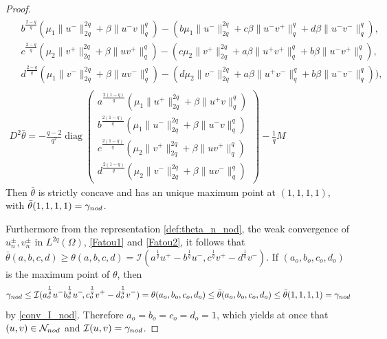 \documentclass[10pt,a4paper]{amsart}
\numberwithin{equation}{section}
\begin{document}
\begin{proof}
\begin{gather*}
\begin{aligned}
& b^{\frac{2-q}q}(\mu_1\|u^-\|_{2q}^{2q} +\beta\|u^-v\|_q^q)
  - (b \mu_1\|u^-\|_{2q}^{2q} +c\beta \|u^-v^+\|_q^q +d \beta \|u^-v^-\|_q^q),\\
&  c^{\frac{2-q}q}(\mu_2\|v^+\|_{2q}^{2q} +\beta\|uv^+\|_q^q)
 - (c \mu_2\|v^+\|_{2q}^{2q} +a\beta \|u^+v^+\|_q^q +b \beta \|u^-v^+\|_q^q),\\
& d^{\frac{2-q}q}(\mu_1\|v^-\|_{2q}^{2q} +\beta\|uv^-\|_q^q)
 - (d \mu_2\|v^-\|_{2q}^{2q} +a\beta \|u^+v^-\|_q^q +b \beta \|u^-v^-\|_q^q)
 \Big),
\end{aligned} \\
 D^2\bar\theta
 = -\frac{q-2}{q^2} \operatorname{diag}
\begin{pmatrix}
 a^{\frac{2(1-q)}q}(\mu_1\|u^+\|_{2q}^{2q} +\beta\|u^+v\|_q^q) \\
 b^{\frac{2(1-q)}q}(\mu_1\|u^-\|_{2q}^{2q} +\beta\|u^-v\|_q^q) \\
 c^{\frac{2(1-q)}q}(\mu_2\|v^+\|_{2q}^{2q} +\beta\|uv^+\|_q^q) \\
 d^{\frac{2(1-q)}q}(\mu_2\|v^-\|_{2q}^{2q} +\beta\|uv^-\|_q^q)
 \end{pmatrix}
- \frac{1}q M
\end{gather*}
Then  $\bar\theta$ is strictly concave and has an unique maximum point at
$(1,1,1,1)$, with $\bar\theta(1,1,1,1)= \gamma_{\rm nod}$.

Furthermore from the representation \eqref{def:theta_n_nod},  the weak convergence
of $u^{\pm}_n, v^{\pm}_n$ in $L^{2q}(\Omega)$, \eqref{Fatou1} and \eqref{Fatou2},
it follows that
$\bar \theta (a,b,c,d)\ge \theta (a,b,c,d)
=\mathcal I(a^{\frac{1}q}u^+\!-b^{\frac{1}q}u^-,c^{\frac{1}q}v^+\! - d^{\frac{1}q}v^-)$.
If $(a_o,b_o,c_o,d_o)$ is the maximum point of $\theta$, then
\[
\gamma_{\rm nod}\le \mathcal I (a_o^{\frac{1}q}u^-b_o^{\frac{1}q}u^-\!,c_o^{\frac{1}q}v^+-
d_o^{\frac{1}q}v^-)
=\theta(a_o,b_o,c_o,d_o) \le \bar\theta(a_o,b_o,c_o,d_o)
\le \bar \theta(1,1,1,1)=\gamma_{\rm nod}
\]
by \eqref{conv_I_nod}.
Therefore $a_o=b_o=c_o=d_o=1$, which yields at once that $(u,v)\in \mathcal N_{\rm nod}$
and $\mathcal I(u,v)=\gamma_{\rm nod}$.
\smallskip


\end{proof}
\end{document}
